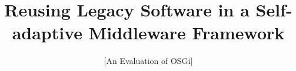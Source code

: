 \documentclass{acm_proc_article-sp}
\begin{document}
%

\title{Reusing Legacy Software in a Self-adaptive Middleware Framework}
\subtitle{[An Evaluation of OSGi]}

%
%
%
%
%


\end{document}
